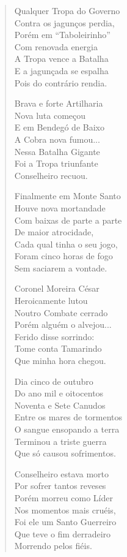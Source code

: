 \begin{verse}
Qualquer Tropa do Governo \\
Contra os jagunços perdia, \\
Porém em ``Taboleirinho'' \\
Com renovada energia \\
A Tropa vence a Batalha \\
E a jagunçada se espalha \\
Pois do contrário rendia. 

Brava e forte Artilharia \\
Nova luta começou \\
E em Bendegó de Baixo \\
A Cobra nova fumou...\\
Nessa Batalha Gigante \\
Foi a Tropa triunfante \\
Conselheiro recuou. 

Finalmente em Monte Santo \\
Houve nova mortandade \\
Com baixas de parte a parte \\
De maior atrocidade, \\
Cada qual tinha o seu jogo, \\
Foram cinco horas de fogo \\
Sem saciarem a vontade. 


Coronel Moreira César \\
Heroicamente lutou \\
Noutro Combate cerrado \\
Porém alguém o alvejou... \\
Ferido disse sorrindo: \\
Tome conta Tamarindo \\
Que minha hora chegou. 

Dia cinco de outubro \\
Do ano mil e oitocentos \\
Noventa e Sete Canudos \\
Entre os mares de tormentos \\
O sangue ensopando a terra \\
Terminou a triste guerra \\
Que só causou sofrimentos. 

Conselheiro estava morto \\
Por sofrer tantos reveses \\
Porém morreu como Líder \\
Nos momentos mais cruéis, \\
Foi ele um Santo Guerreiro \\
Que teve o fim derradeiro \\
Morrendo pelos fiéis. 


\end{verse}
